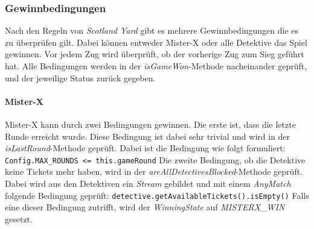             \subsubsection{Gewinnbedingungen}
                Nach den Regeln von \textit{Scotland Yard} gibt es mehrere Gewinnbedingungen die es zu überprüfen gilt.
                Dabei können entweder Mister-X oder alle Detektive das Spiel gewinnen.
                Vor jedem Zug wird überprüft, ob der vorherige Zug zum Sieg geführt hat.
                Alle Bedingungen werden in der \textit{isGameWon}-Methode nacheinander geprüft, und der jeweilige Status zurück gegeben.

                \paragraph{Mister-X}
                    Mister-X kann durch zwei Bedingungen gewinnen.
                    Die erste ist, dass die letzte Runde erreicht wurde.
                    Diese Bedingung ist dabei sehr trivial und wird in der \textit{isLastRound}-Methode geprüft.
                    Dabei ist die Bedingung wie folgt formuliert:
                    \newline
                    \newline
                    \texttt{Config.MAX\_ROUNDS  <= this.gameRound}
                    \newline
                    \newline
                    Die zweite Bedingung, ob die Detektive keine Tickets mehr haben,
                    wird in der \textit{areAllDetectivesBlocked}-Methode geprüft.
                    Dabei wird aus den Detektiven ein \textit{Stream} gebildet und mit einem
                    \textit{AnyMatch} folgende Bedingung geprüft:
                    \newline
                    \newline
                    \texttt{detective.getAvailableTickets().isEmpty()}
                    \newline
                    \newline
                    Falls eine dieser Bedingung zutrifft, wird der \textit{WinningState} auf \textit{MISTERX\_WIN} gesetzt.

